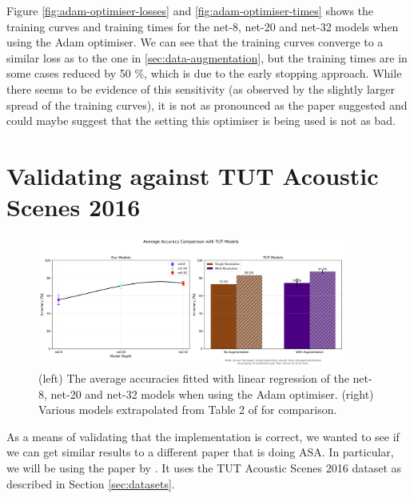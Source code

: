 \documentclass[logo,bsc,singlespacing,parskip,online]{infthesis}
\begin{document}
Figure \ref{fig:adam-optimiser-losses} and \ref{fig:adam-optimiser-times} shows 
the training curves and training times for the net-8, net-20 and net-32 models
when using the Adam optimiser. We can see that the training curves converge to a 
similar loss as to the one in \ref{sec:data-augmentation}, but the training times 
are in some cases reduced by 50 \%, which is due to the early stopping approach.
While there seems to be evidence of this sensitivity (as observed by the slightly larger spread 
of the training curves), it is not as pronounced as the paper suggested and 
could maybe suggest that the setting this optimiser is being used 
is not as bad. 

\section{Validating against TUT Acoustic Scenes 2016}
\begin{figure}[h]
   \centering
   \includegraphics[width=0.9\textwidth]{average_accuracies_tut_comparison.png}
   \caption{(left) The average accuracies fitted with linear regression of the net-8, net-20 and net-32 models when using the Adam optimiser. 
   (right) Various models extrapolated from Table 2 of \citet{schindler_multi-temporal_2018} for comparison.}
   \label{fig:tut-asa-results}
\end{figure}
As a means of validating that the implementation is correct, 
we wanted to see if we can get similar results to a different paper 
that is doing ASA. In particular, we will be using the paper by 
\citet{schindler_multi-temporal_2018}. It uses the TUT Acoustic Scenes 2016 dataset
as described in Section \ref{sec:datasets}.
\end{document}
